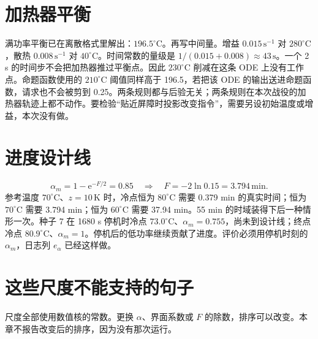 \section{加热器平衡}

满功率平衡已在离散格式里解出：\(196.5^\circ\mathrm{C}\)。再写中间量。增益 \(0.015\,\mathrm{s}^{-1}\) 对 \(280^\circ\mathrm{C}\)，散热 \(0.008\,\mathrm{s}^{-1}\) 对 \(40^\circ\mathrm{C}\)。时间常数的量级是 \(1/(0.015+0.008)\approx 43\,\mathrm{s}\)。一个 2 s 的时间步不会把加热器推过平衡点。因此 \(230^\circ\mathrm{C}\) 削减在这条 ODE 上没有工作点。命题函数使用的 \(210^\circ\mathrm{C}\) 阈值同样高于 196.5，若把该 ODE 的输出送进命题函数，请求也不会被剪到 0.25。两条规则都与后验无关；两条规则在本次战役的加热器轨迹上都不动作。要检验“贴近屏障时投影改变指令”，需要另设初始温度或增益，本次没有做。

\section{进度设计线}

\[
\alpha_m=1-\mathrm{e}^{-F/2}=0.85
\quad\Rightarrow\quad
F=-2\ln 0.15=3.794\,\mathrm{min}.
\]
参考温度 \(70^\circ\mathrm{C}\)、\(z=10\,\mathrm{K}\) 时，冷点恒为 \(80^\circ\mathrm{C}\) 需要 0.379 min 的真实时间；恒为 \(70^\circ\mathrm{C}\) 需要 3.794 min；恒为 \(60^\circ\mathrm{C}\) 需要 37.94 min。55 min 的时域装得下后一种情形一次。种子 7 在 1680 s 停机时冷点 \(73.0^\circ\mathrm{C}\)、\(\alpha_m=0.755\)，尚未到设计线；终点冷点 \(80.9^\circ\mathrm{C}\)、\(\alpha_m=1\)。停机后的低功率继续贡献了进度。评价必须用停机时刻的 \(\alpha_m\)，日志列 \(e_{\alpha}\) 已经这样做。

\section{这些尺度不能支持的句子}

尺度全部使用数值核的常数。更换 \(\alpha\)、界面系数或 \(F\) 的除数，排序可以改变。本章不报告改变后的排序，因为没有那次运行。
